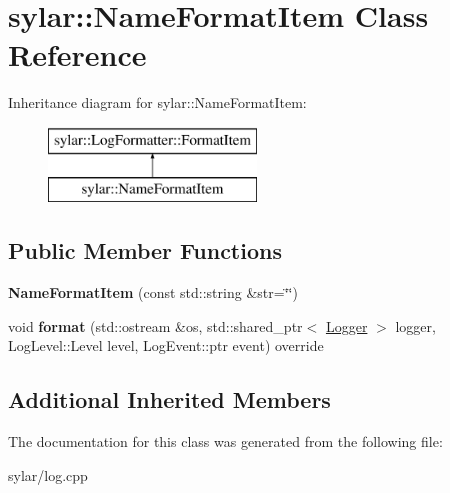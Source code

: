 \hypertarget{classsylar_1_1NameFormatItem}{\section{sylar\-:\-:Name\-Format\-Item Class Reference}
\label{classsylar_1_1NameFormatItem}
}
Inheritance diagram for sylar\-:\-:Name\-Format\-Item\-:\begin{figure}[H]
\begin{center}
\leavevmode
\includegraphics[height=2.000000cm]{classsylar_1_1NameFormatItem}
\end{center}
\end{figure}
\subsection*{Public Member Functions}
\begin{DoxyCompactItemize}
\item 
\hypertarget{classsylar_1_1NameFormatItem_a759053b7f69f30e8760374414fbe5ee9}{{\bfseries Name\-Format\-Item} (const std\-::string \&str=\char`\"{}\char`\"{})}\label{classsylar_1_1NameFormatItem_a759053b7f69f30e8760374414fbe5ee9}

\item 
\hypertarget{classsylar_1_1NameFormatItem_a18e3df843d842eac75f8b2b091f665ff}{void {\bfseries format} (std\-::ostream \&os, std\-::shared\-\_\-ptr$<$ \hyperlink{classsylar_1_1Logger}{Logger} $>$ logger, Log\-Level\-::\-Level level, Log\-Event\-::ptr event) override}\label{classsylar_1_1NameFormatItem_a18e3df843d842eac75f8b2b091f665ff}

\end{DoxyCompactItemize}
\subsection*{Additional Inherited Members}


The documentation for this class was generated from the following file\-:\begin{DoxyCompactItemize}
\item 
sylar/log.\-cpp\end{DoxyCompactItemize}
